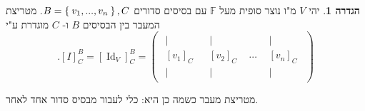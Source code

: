 \documentclass[12pt]{report}
\theoremstyle{plain}
\theoremstyle{definition}
\newtheorem{definition}[theorem]{הגדרה}
\newcommand{\F}{\mathbb{F}}
\newcommand{\0}{\mathbf{0}}
\DeclareMathOperator{\Id}{Id}
\begin{document}
\begin{definition}
יהי
$V$
מ"ו נוצר סופית מעל
$\F$
עם בסיסים סדורים
$B=\Set{v_1,...,v_n},C$.
מטריצת המעבר בין הבסיסים
$B$
ו-
$C$
מוגדרת ע"י
$$
.[I]_C^B=[\Id_V]_C^B=\begin{pmatrix}
\begin{array}{c}
|\\[-0.4ex]
[v_1]_C\\[-0.4ex]
|
\end{array}
&
\begin{array}{c}
|\\[-0.4ex]
[v_2]_C\\[-0.4ex]
|
\end{array}
&
\cdots
&
\begin{array}{c}
|\\[-0.4ex]
[v_n]_C\\[-0.4ex]
|
\end{array}
\end{pmatrix}
$$
\end{definition}
מטריצת מעבר כשמה כן היא: כלי לעבור מבסיס סדור אחד לאחר.
\end{document}
